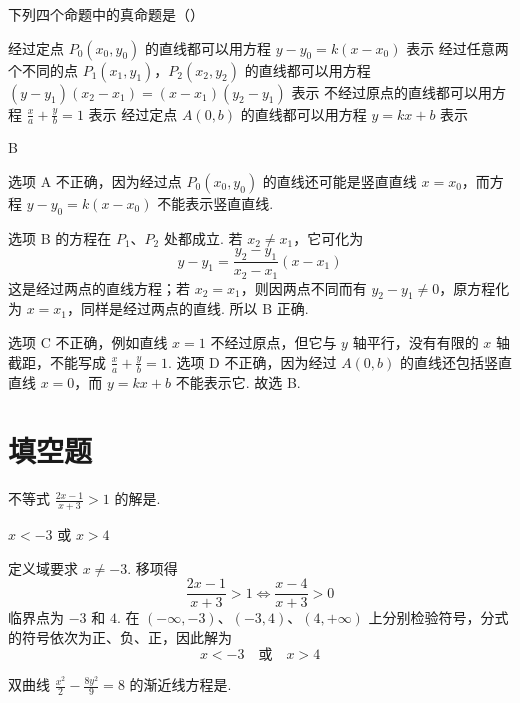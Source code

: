 \documentclass[UTF8,a4paper,oneside,11pt]{ctexbook}
\begin{document}
\begin{problem}
下列四个命题中的真命题是（\quad）

\choices
    {经过定点 \(P_0(x_0,y_0)\) 的直线都可以用方程 \(y-y_0=k(x-x_0)\) 表示}
    {经过任意两个不同的点 \(P_1(x_1,y_1)\)，\(P_2(x_2,y_2)\) 的直线都可以用方程 \((y-y_1)(x_2-x_1)=(x-x_1)(y_2-y_1)\) 表示}
    {不经过原点的直线都可以用方程 \(\frac{x}{a}+\frac{y}{b}=1\) 表示}
    {经过定点 \(A(0,b)\) 的直线都可以用方程 \(y=kx+b\) 表示}
\end{problem}

\begin{answer}
B
\end{answer}

\begin{solution}
选项 A 不正确，因为经过点 \(P_0(x_0,y_0)\) 的直线还可能是竖直直线 \(x=x_0\)，而方程 \(y-y_0=k(x-x_0)\) 不能表示竖直直线.

选项 B 的方程在 \(P_1\)、\(P_2\) 处都成立. 若 \(x_2\ne x_1\)，它可化为
\[
y-y_1=\frac{y_2-y_1}{x_2-x_1}(x-x_1)
\]
这是经过两点的直线方程；若 \(x_2=x_1\)，则因两点不同而有 \(y_2-y_1\ne0\)，原方程化为 \(x=x_1\)，同样是经过两点的直线. 所以 B 正确.

选项 C 不正确，例如直线 \(x=1\) 不经过原点，但它与 \(y\) 轴平行，没有有限的 \(x\) 轴截距，不能写成 \(\frac{x}{a}+\frac{y}{b}=1\). 选项 D 不正确，因为经过 \(A(0,b)\) 的直线还包括竖直直线 \(x=0\)，而 \(y=kx+b\) 不能表示它. 故选 B.
\end{solution}

\section{填空题}

\begin{problem}
不等式 \(\frac{2x-1}{x+3}>1\) 的解是\fillinblank{}.
\end{problem}

\begin{answer}
\(x<-3\) 或 \(x>4\)
\end{answer}

\begin{solution}
定义域要求 \(x\ne-3\). 移项得
\[
\frac{2x-1}{x+3}>1
\iff \frac{x-4}{x+3}>0
\]
临界点为 \(-3\) 和 \(4\). 在 \((-\infty,-3)\)、\((-3,4)\)、\((4,+\infty)\) 上分别检验符号，分式的符号依次为正、负、正，因此解为
\[
x<-3\quad\text{或}\quad x>4
\]
\end{solution}

\begin{problem}
双曲线 \(\frac{x^2}{2}-\frac{8y^2}{9}=8\) 的渐近线方程是\fillinblank{}.
\end{problem}
\end{document}
